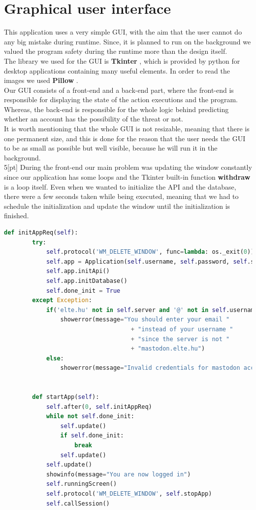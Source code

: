 \section{Graphical user interface}
This application uses a very simple GUI, with the aim that the user cannot do any big mistake during runtime.
Since, it is planned to run on the background we valued the program safety during the runtime more than the design
itself.
\\[5pt]
The library we used for the GUI is \textbf{Tkinter} \cite{tkinter}, which is provided by python for desktop applications containing many
useful elements. In order to read the images we used \textbf{Pillow} \cite{pil}.
\\[5pt]
Our GUI consists of a front-end and a back-end part, where the front-end is responsible for displaying the state of the action
executions and the program. Whereas, the back-end is responsible for the whole logic behind predicting whether an account has
the possibility of the threat or not.
\\[5pt]
It is worth mentioning that the whole GUI is not resizable, meaning that there is one permanent size, and this is done for the reason
that the user needs the GUI to be as small as possible but well visible, because he will run it in the background.
\\5[pt]
During the front-end our main problem was updating the window constantly since our application has some loops and the Tkinter
built-in function \textbf{withdraw} is a loop itself. Even when we wanted to initialize the API and the database, there were a few
seconds taken while being executed, meaning that we had to schedule the initialization and update the window until the initialization
is finished. 
\\[5pt]
\begin{lstlisting}[language=python, caption={Updating window while initializing the API and database}, captionpos=b]
	def initAppReq(self):
		try:
			self.protocol('WM_DELETE_WINDOW', func=lambda: os._exit(0))
			self.app = Application(self.username, self.password, self.server)
			self.app.initApi()
			self.app.initDatabase()
			self.done_init = True
		except Exception:
			if('elte.hu' not in self.server and '@' not in self.username):
				showerror(message="You should enter your email "
									+ "instead of your username "
									+ "since the server is not "
									+ "mastodon.elte.hu")
			else:
				showerror(message="Invalid credentials for mastodon account")
							
		
		def startApp(self):
			self.after(0, self.initAppReq)
			while not self.done_init:
				self.update()
				if self.done_init:
					break
				self.update()
			self.update()
			showinfo(message="You are now logged in")
			self.runningScreen()
			self.protocol('WM_DELETE_WINDOW', self.stopApp)
			self.callSession()
	
\end{lstlisting}
